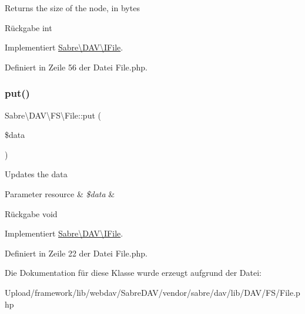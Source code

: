 Returns the size of the node, in bytes

\begin{DoxyReturn}{Rückgabe}
int 
\end{DoxyReturn}


Implementiert \mbox{\hyperlink{interface_sabre_1_1_d_a_v_1_1_i_file_aa1534e00805f45d9282de9c699dbe178}{Sabre\textbackslash{}\+D\+A\+V\textbackslash{}\+I\+File}}.



Definiert in Zeile 56 der Datei File.\+php.

\mbox{\label{class_sabre_1_1_d_a_v_1_1_f_s_1_1_file_adad097762986bc953af13c17fdae517c}} 
\subsubsection{\texorpdfstring{put()}{put()}}
{\footnotesize\ttfamily Sabre\textbackslash{}\+D\+A\+V\textbackslash{}\+F\+S\textbackslash{}\+File\+::put (\begin{DoxyParamCaption}\item[{}]{\$data }\end{DoxyParamCaption})}

Updates the data


\begin{DoxyParams}[1]{Parameter}
resource & {\em \$data} & \\
\hline
\end{DoxyParams}
\begin{DoxyReturn}{Rückgabe}
void 
\end{DoxyReturn}


Implementiert \mbox{\hyperlink{interface_sabre_1_1_d_a_v_1_1_i_file_a0c30bc87b22d289f311c854f23993452}{Sabre\textbackslash{}\+D\+A\+V\textbackslash{}\+I\+File}}.



Definiert in Zeile 22 der Datei File.\+php.



Die Dokumentation für diese Klasse wurde erzeugt aufgrund der Datei\+:\begin{DoxyCompactItemize}
\item 
Upload/framework/lib/webdav/\+Sabre\+D\+A\+V/vendor/sabre/dav/lib/\+D\+A\+V/\+F\+S/File.\+php\end{DoxyCompactItemize}
